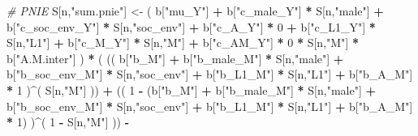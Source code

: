 \documentclass[
]{book}
\newenvironment{Shaded}{\begin{snugshade}}{\end{snugshade}}
\newcommand{\CommentTok}[1]{\textcolor[rgb]{0.56,0.35,0.01}{\textit{#1}}}
\newcommand{\DecValTok}[1]{\textcolor[rgb]{0.00,0.00,0.81}{#1}}
\newcommand{\NormalTok}[1]{#1}
\newcommand{\OtherTok}[1]{\textcolor[rgb]{0.56,0.35,0.01}{#1}}
\newcommand{\SpecialCharTok}[1]{\textcolor[rgb]{0.81,0.36,0.00}{\textbf{#1}}}
\newcommand{\StringTok}[1]{\textcolor[rgb]{0.31,0.60,0.02}{#1}}
\begin{document}
\begin{Shaded}
\begin{Highlighting}[]
    \CommentTok{\# PNIE }
\NormalTok{    S[n,}\StringTok{"sum.pnie"}\NormalTok{] }\OtherTok{\textless{}{-}}\NormalTok{ ( b[}\StringTok{"mu\_Y"}\NormalTok{] }\SpecialCharTok{+} 
\NormalTok{                           b[}\StringTok{"c\_male\_Y"}\NormalTok{] }\SpecialCharTok{*}\NormalTok{ S[n,}\StringTok{"male"}\NormalTok{] }\SpecialCharTok{+} 
\NormalTok{                           b[}\StringTok{"c\_soc\_env\_Y"}\NormalTok{] }\SpecialCharTok{*}\NormalTok{ S[n,}\StringTok{"soc\_env"}\NormalTok{] }\SpecialCharTok{+} 
\NormalTok{                           b[}\StringTok{"c\_A\_Y"}\NormalTok{] }\SpecialCharTok{*} \DecValTok{0} \SpecialCharTok{+} 
\NormalTok{                           b[}\StringTok{"c\_L1\_Y"}\NormalTok{] }\SpecialCharTok{*}\NormalTok{ S[n,}\StringTok{"L1"}\NormalTok{] }\SpecialCharTok{+}
\NormalTok{                           b[}\StringTok{"c\_M\_Y"}\NormalTok{] }\SpecialCharTok{*}\NormalTok{ S[n,}\StringTok{"M"}\NormalTok{] }\SpecialCharTok{+}
\NormalTok{                           b[}\StringTok{"c\_AM\_Y"}\NormalTok{] }\SpecialCharTok{*} \DecValTok{0} \SpecialCharTok{*}\NormalTok{ S[n,}\StringTok{"M"}\NormalTok{] }\SpecialCharTok{*}\NormalTok{ b[}\StringTok{"A.M.inter"}\NormalTok{] ) }\SpecialCharTok{*}
\NormalTok{      ( (( b[}\StringTok{"b\_M"}\NormalTok{] }\SpecialCharTok{+} 
\NormalTok{             b[}\StringTok{"b\_male\_M"}\NormalTok{] }\SpecialCharTok{*}\NormalTok{ S[n,}\StringTok{"male"}\NormalTok{] }\SpecialCharTok{+} 
\NormalTok{             b[}\StringTok{"b\_soc\_env\_M"}\NormalTok{] }\SpecialCharTok{*}\NormalTok{ S[n,}\StringTok{"soc\_env"}\NormalTok{] }\SpecialCharTok{+} 
\NormalTok{             b[}\StringTok{"b\_L1\_M"}\NormalTok{] }\SpecialCharTok{*}\NormalTok{ S[n,}\StringTok{"L1"}\NormalTok{] }\SpecialCharTok{+}
\NormalTok{             b[}\StringTok{"b\_A\_M"}\NormalTok{] }\SpecialCharTok{*} \DecValTok{1}\NormalTok{ )}\SpecialCharTok{\^{}}\NormalTok{( S[n,}\StringTok{"M"}\NormalTok{] )) }\SpecialCharTok{+}
\NormalTok{          (( }\DecValTok{1} \SpecialCharTok{{-}}\NormalTok{ (b[}\StringTok{"b\_M"}\NormalTok{] }\SpecialCharTok{+} 
\NormalTok{                    b[}\StringTok{"b\_male\_M"}\NormalTok{] }\SpecialCharTok{*}\NormalTok{ S[n,}\StringTok{"male"}\NormalTok{] }\SpecialCharTok{+} 
\NormalTok{                    b[}\StringTok{"b\_soc\_env\_M"}\NormalTok{] }\SpecialCharTok{*}\NormalTok{ S[n,}\StringTok{"soc\_env"}\NormalTok{] }\SpecialCharTok{+} 
\NormalTok{                    b[}\StringTok{"b\_L1\_M"}\NormalTok{] }\SpecialCharTok{*}\NormalTok{ S[n,}\StringTok{"L1"}\NormalTok{] }\SpecialCharTok{+}
\NormalTok{                    b[}\StringTok{"b\_A\_M"}\NormalTok{] }\SpecialCharTok{*} \DecValTok{1}\NormalTok{) )}\SpecialCharTok{\^{}}\NormalTok{( }\DecValTok{1} \SpecialCharTok{{-}}\NormalTok{ S[n,}\StringTok{"M"}\NormalTok{] )) }\SpecialCharTok{{-}}

\end{Highlighting}
\end{Shaded}
\end{document}

